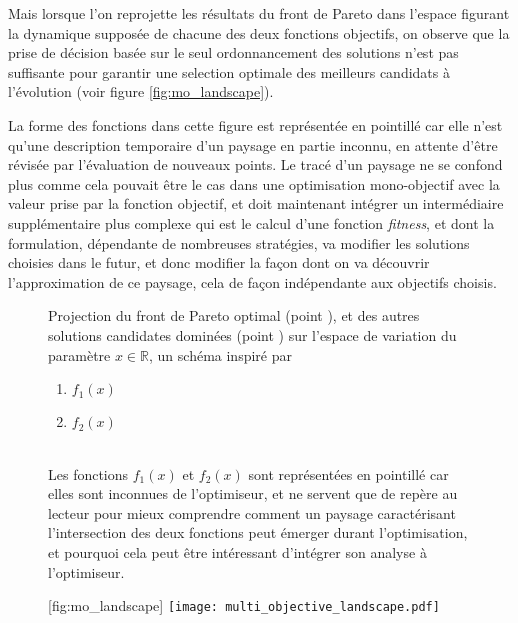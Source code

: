Mais lorsque l'on reprojette les résultats du front de Pareto dans l'espace figurant la dynamique supposée de chacune des deux fonctions objectifs, on observe que la prise de décision basée sur le seul ordonnancement des solutions n'est pas suffisante pour garantir une selection optimale des meilleurs candidats à l'évolution (voir figure \ref{fig:mo_landscape}).

La forme des fonctions dans cette figure est représentée en pointillé car elle n'est qu'une description temporaire d'un paysage en partie inconnu, en attente d'être révisée par l'évaluation de nouveaux points. Le tracé d'un paysage ne se confond plus comme cela pouvait être le cas dans une optimisation mono-objectif avec la valeur prise par la fonction objectif, et doit maintenant intégrer un intermédiaire supplémentaire plus complexe qui est le calcul d'une fonction \textit{fitness}, et dont la formulation, dépendante de nombreuses stratégies, va modifier les solutions choisies dans le futur, et donc modifier la façon dont on va découvrir l'approximation de ce paysage, cela de façon indépendante aux objectifs choisis. \autocite{Weise2011}

\begin{figure}[!htbp]
	\begin{sidecaption}[fortoc]{Projection du front de Pareto optimal (point ), et des autres solutions candidates dominées (point ) sur l'espace de variation du paramètre $x \in \mathbb{R}$, un schéma inspiré par \textcite[67]{Weise2011}
	\parbox{\marginparwidth}{
	\begin{enumerate}[label={},labelindent=0pt,leftmargin=*]
	      \item {} $f_{1}(x)$
	      \item {} $f_{2}(x)$
	\end{enumerate}}\\
	Les fonctions $f_{1}(x)$ et $f_{2}(x)$ sont représentées en pointillé car elles sont inconnues de l'optimiseur, et ne servent que de repère au lecteur pour mieux comprendre comment un paysage caractérisant l'intersection des deux fonctions peut émerger durant l'optimisation, et pourquoi cela peut être intéressant d'intégrer son analyse à l'optimiseur.}[fig:mo_landscape]
	 \centering
	 	\texttt{[image: multi\_objective\_landscape.pdf]}
	\end{sidecaption}
\end{figure}



